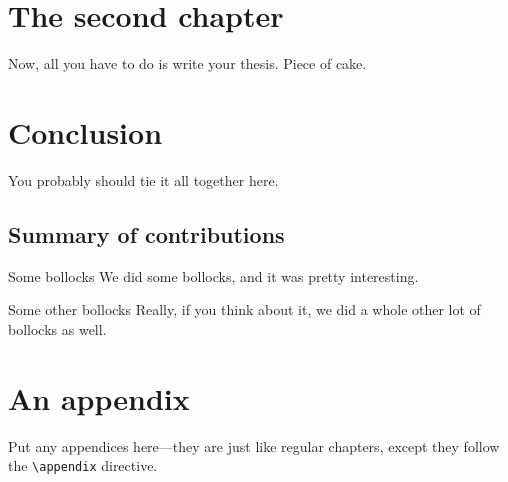 \documentclass[12pt,xetex]{scrbook}
\begin{document}
\begin{onehalfspace}


\chapter{The second chapter}
\label{chap:second-chapter}

Now, all you have to do is write your thesis.  Piece of cake.


\chapter{Conclusion}
\label{chap:conclusion}

You probably should tie it all together here.

\section{Summary of contributions}
\label{sec:summary-of-contributions}

\begin{headinglist}
\item[Some bollocks]
  We did some bollocks, and it was pretty interesting.
\item[Some other bollocks] 
  Really, if you think about it, we did a whole other lot of bollocks
  as well.
\end{headinglist}


\appendix

\chapter{An appendix}
\label{chap:an-appendix}

Put any appendices here---they are just like regular chapters, except
they follow the \texttt{\textbackslash{}appendix} directive.

\end{onehalfspace}

\backmatter


\printbibliography[title=References,heading=bibintoc]
\end{document}
